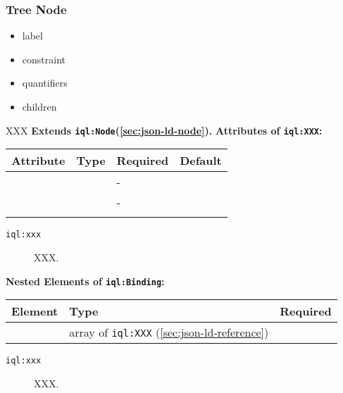 \documentclass[11pt]{article}
\newcommand{\iqlns}{iql:}
\newcommand{\iqlType}[1]{\texttt{\iqlns#1}}
\newcommand{\attributes}[1]{\noindent\textbf{Attributes of \iqlType{#1}:}\newline\medskip}
\newcommand{\elements}[1]{\noindent\textbf{Nested Elements of \iqlType{#1}:}\newline\medskip}
\newcommand{\desc}[1]{\noindent#1\newline\medskip}
\newcommand{\extends}[2]{\noindent\textbf{Extends \iqlType{#1}(#2).}\newline\medskip}
\begin{document}
\subsubsection{Tree Node}
\label{sec:json-ld-tree-node}
\begin{itemize}
\item label
\item constraint
\item quantifiers
\item children
\end{itemize}
\desc{XXX}
\extends{Node}{\ref{sec:json-ld-node}}
\attributes{XXX}
\begin{tabular}{|p{}|p{}|p{}|p{}|}
	\hline
	\textbf{Attribute} & \textbf{Type} & \textbf{Required} & \textbf{Default} \\ 
	\hline
	\hline
	&  & - &  \\ 
	\hline 
	&  & - &  \\ 
	\hline 
	&  &  & \\ 
	\hline 
\end{tabular}
\begin{description}
	\item[\iqlType{xxx}] XXX.
\end{description}
\elements{Binding}
\begin{tabular}{|p{}|p{}|p{}|}
	\hline
	\textbf{Element} & \textbf{Type} & \textbf{Required} \\ 
	\hline
	\hline 
	& array of \iqlType{XXX} (\ref{sec:json-ld-reference}) &  \\ 
	\hline 
\end{tabular}
\begin{description}
	\item[\iqlType{xxx}] XXX.
\end{description}

\end{document}
